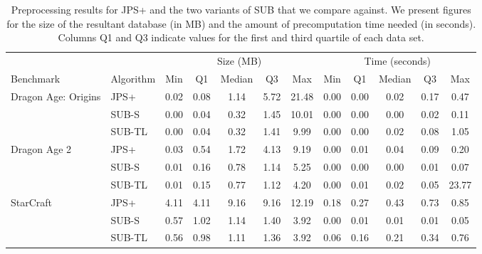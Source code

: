 \begin{table}[b!]
\label{table::preproc}
\centering
\begin{tabular}{ll|ccccc|ccccc}
  \hline
 & &  \multicolumn{5}{|c|}{Size (MB)} & \multicolumn{5}{c}{Time (seconds)} \\ 
Benchmark & Algorithm & Min & Q1 & Median & Q3 & Max & Min & Q1 & Median & Q3 & Max \\ \hline
\multirow{3}{*}{Dragon Age: Origins} 
 & JPS+ & 0.02 & 0.08 & 1.14 & 5.72 & 21.48 & 0.00 & 0.00 & 0.02 & 0.17 & 0.47 \\ 
 & SUB-S & 0.00 & 0.04 & 0.32 & 1.45 & 10.01 & 0.00 & 0.00 & 0.00 & 0.02 & 0.11 \\ 
 & SUB-TL & 0.00 & 0.04 & 0.32 & 1.41 & 9.99 & 0.00 & 0.00 & 0.02 & 0.08 & 1.05 \\  \hline

\multirow{3}{*}{Dragon Age 2}
 & JPS+ & 0.03 & 0.54 & 1.72 & 4.13 & 9.19 & 0.00 & 0.01 & 0.04 & 0.09 & 0.20 \\ 
 & SUB-S & 0.01 & 0.16 & 0.78 & 1.14 & 5.25 & 0.00 & 0.00 & 0.00 & 0.01 & 0.07 \\ 
 & SUB-TL & 0.01 & 0.15 & 0.77 & 1.12 & 4.20 & 0.00 & 0.01 & 0.02 & 0.05 & 23.77 \\ \hline

\multirow{3}{*}{StarCraft}
 & JPS+ & 4.11 & 4.11 & 9.16 & 9.16 & 12.19 & 0.18 & 0.27 & 0.43 & 0.73 & 0.85 \\ 
 & SUB-S & 0.57 & 1.02 & 1.14 & 1.40 & 3.92 & 0.00 & 0.01 & 0.01 & 0.01 & 0.05 \\ 
 & SUB-TL & 0.56 & 0.98 & 1.11 & 1.36 & 3.92 & 0.06 & 0.16 & 0.21 & 0.34 & 0.76 \\ \hline
\end{tabular}
\vspace{1em}
\caption{Preprocessing results for JPS+ and the two variants of SUB that we compare against. 
We present figures for the size of the resultant database (in MB) and the amount of
precomputation time needed (in seconds). Columns Q1 and Q3 indicate values for the 
first and third quartile of each data set.}
\end{table}
